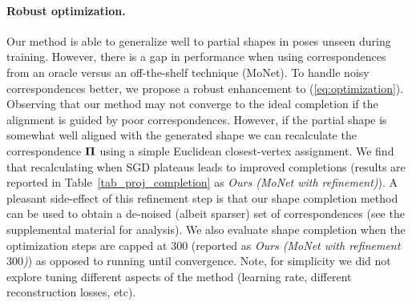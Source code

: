 \paragraph{Robust optimization.}
Our method is able to generalize well to partial shapes in poses unseen during training. However, there is a gap in performance when using correspondences from an oracle versus an off-the-shelf technique (MoNet). To handle noisy correspondences better, we propose a robust enhancement to (\ref{eq:optimization}). Observing that our method may not converge to the ideal completion if the alignment is guided by poor correspondences. However, if the partial shape is somewhat well aligned with the generated shape we can recalculate the correspondence $\bm{\mathrm{\Pi}}$ using a simple Euclidean closest-vertex assignment. We find that recalculating when SGD plateaus leads to improved completions (results are reported in Table~\ref{tab_proj_completion} as \emph{Ours (MoNet with refinement)}).
A pleasant side-effect of this refinement step is that our shape completion method can be used to obtain a de-noised (albeit sparser) set  of correspondences (see the supplemental material for analysis).
We also evaluate shape completion when the optimization steps are capped at 300 (reported as \emph{Ours (MoNet with refinement $300$)}) as opposed to running until convergence. Note, for simplicity we did not explore tuning different aspects of the method (learning rate, different reconstruction losses, etc).

